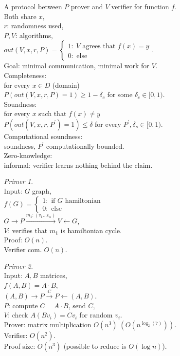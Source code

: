 \documentclass[a4paper, 12pt]{book}
\theoremstyle{definition}
\theoremstyle{remark}
\newtheorem*{ex}{Primer}
\begin{document}
A protocol between $P$ prover and $V$ verifier for function $f$. \\
Both share $x$, \\
$r$: randomness used, \\
$P, V$: algorithms, \\
$out(V, x, r, P) = \begin{cases}
  1: \; V \text{ agrees that } f(x) = y \\
  0: \text{ else}
\end{cases}$. \\
Goal: minimal communication, minimal work for $V$. \\
Completeness: \\
for every $x \in D$ (domain) \\
$P(out(V, x, r, P) = 1) \geq 1 - \delta_c$ for some $\delta_c \in [0, 1)$. \\
Soundness: \\
for every $x$ such that $f(x) \neq y$ \\
$P(out(V, x, r, P^{'}) = 1) \leq \delta$ for every $P^{'}, \delta_s \in [0, 1)$. \\
Computational soundness: \\
soundness, $P^{'}$ computationally bounded. \\
Zero-knowledge: \\
informal: verifier learns nothing behind the claim.
\begin{ex} \text{} \\
  Input: $G$ graph, \\
  $f(G) = \begin{cases}
    1: \text{ if $G$ hamiltonian} \\
    0: \text{ else}
  \end{cases}$ \\
  $G \to P \stackrel{m_1: (v_1 \dots v_n)}{\longrightarrow} V \leftarrow G$, \\
  $V$: verifies that $m_1$ is hamiltonian cycle. \\
  Proof: $O(n)$. \\
  Verifier com. $O(n)$.
\end{ex}
\begin{ex} \text{} \\
  Input: $A, B$ matrices, \\
  $f(A, B) = A \cdot B$, \\
  $(A, B) \to P \stackrel{C}{\to} P \leftarrow (A, B)$. \\
  $P$: compute $C = A \cdot B$, send $C$, \\
  $V$: check $A (B v_i) = C v_i$ for random $v_i$. \\
  Prover: matrix multiplication $O(n^3) \; (O(n^{\log_2(7)}))$. \\
  Verifier: $O(n^2)$. \\
  Proof size: $O(n^3)$ (possible to reduce is $O(\log n)$).
\end{ex}
\end{document}
